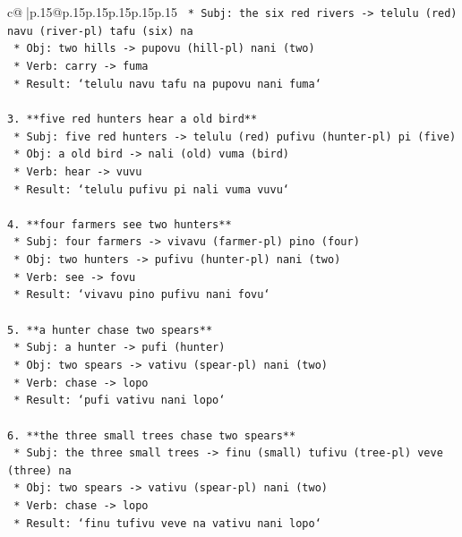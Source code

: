 \documentclass{article}
\begin{document}
{\begin{supertabular}{c@{$\;$}|p{.15\linewidth}@{}p{.15\linewidth}p{.15\linewidth}p{.15\linewidth}p{.15\linewidth}p{.15\linewidth}}
{{{\texttt{    *   Subj: the six red rivers {-}> telulu (red) navu (river{-}pl) tafu (six) na} \\
\texttt{    *   Obj: two hills {-}> pupovu (hill{-}pl) nani (two)} \\
\texttt{    *   Verb: carry {-}> fuma} \\
\texttt{    *   Result: `telulu navu tafu na pupovu nani fuma`} \\
\\ 
\texttt{3.  **five red hunters hear a old bird**} \\
\texttt{    *   Subj: five red hunters {-}> telulu (red) pufivu (hunter{-}pl) pi (five)} \\
\texttt{    *   Obj: a old bird {-}> nali (old) vuma (bird)} \\
\texttt{    *   Verb: hear {-}> vuvu} \\
\texttt{    *   Result: `telulu pufivu pi nali vuma vuvu`} \\
\\ 
\texttt{4.  **four farmers see two hunters**} \\
\texttt{    *   Subj: four farmers {-}> vivavu (farmer{-}pl) pino (four)} \\
\texttt{    *   Obj: two hunters {-}> pufivu (hunter{-}pl) nani (two)} \\
\texttt{    *   Verb: see {-}> fovu} \\
\texttt{    *   Result: `vivavu pino pufivu nani fovu`} \\
\\ 
\texttt{5.  **a hunter chase two spears**} \\
\texttt{    *   Subj: a hunter {-}> pufi (hunter)} \\
\texttt{    *   Obj: two spears {-}> vativu (spear{-}pl) nani (two)} \\
\texttt{    *   Verb: chase {-}> lopo} \\
\texttt{    *   Result: `pufi vativu nani lopo`} \\
\\ 
\texttt{6.  **the three small trees chase two spears**} \\
\texttt{    *   Subj: the three small trees {-}> finu (small) tufivu (tree{-}pl) veve (three) na} \\
\texttt{    *   Obj: two spears {-}> vativu (spear{-}pl) nani (two)} \\
\texttt{    *   Verb: chase {-}> lopo} \\
\texttt{    *   Result: `finu tufivu veve na vativu nani lopo`} \\
}}}
\end{supertabular}}
\end{document}
